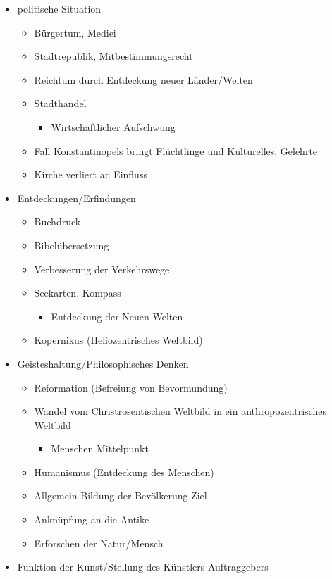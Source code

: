 \begin{itemize}
	\item politische Situation
	\begin{itemize}
		\item Bürgertum, Mediei
		\item Stadtrepublik, Mitbestimmungsrecht
		\item Reichtum durch Entdeckung neuer Länder/Welten
		\item Stadthandel
		\begin{itemize}
			\item Wirtschaftlicher Aufschwung
		\end{itemize}
		\item Fall Konstantinopels bringt Flüchtlinge und Kulturelles, Gelehrte
		\item Kirche verliert an Einfluss
	\end{itemize}
	\item Entdeckungen/Erfindungen
	\begin{itemize}
		\item Buchdruck
		\item Bibelübersetzung
		\item Verbesserung der Verkehrswege
		\item Seekarten, Kompass
		\begin{itemize}
			\item Entdeckung der Neuen Welten
		\end{itemize}
		\item Kopernikus (Heliozentrisches Weltbild)
	\end{itemize}
	\item Geisteshaltung/Philosophisches Denken
	\begin{itemize}
		\item Reformation (Befreiung von Bevormundung)
		\item Wandel vom Christrosentischen Weltbild in ein anthropozentrisches Weltbild
		\begin{itemize}
			\item Menschen \entspricht Mittelpunkt
		\end{itemize}
		\item Humanismus (Entdeckung des Menschen)
		\item Allgemein Bildung der Bevölkerung \entspricht Ziel
		\item Anknüpfung an die Antike
		\item Erforschen der Natur/Mensch
	\end{itemize}
	\item Funktion der Kunst/Stellung des Künstlers Auftraggebers

\end{itemize}
